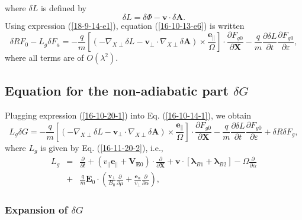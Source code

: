 \documentclass{article}
\newcommand{\tmmathbf}[1]{\ensuremath{\boldsymbol{#1}}}
\begin{document}
where $\delta L$ is defined by
\begin{equation}
  \label{19-1-2-p1} \delta L = \delta \Phi -\mathbf{v} \cdot \delta
  \mathbf{A}.
\end{equation}
Using expression (\ref{18-9-14-e1}), equation (\ref{16-10-13-e6}) is written
\begin{equation}
  \label{16-10-20-1} \delta R F_0 - L_g \delta F_a = - \frac{q}{m} \left[ (-
  \nabla_{X \perp} \delta L -\mathbf{v}_{\perp} \cdot \nabla_{X \perp} \delta
  \mathbf{A}) \times \frac{\tmmathbf{e}_{\parallel}}{\Omega} \right] \cdot
  \frac{\partial F_{g 0}}{\partial \mathbf{X}} - \frac{q}{m}  \frac{\partial
  \delta L}{\partial t}  \frac{\partial F_{g 0}}{\partial \varepsilon},
\end{equation}
where all terms are of $O (\lambda^2)$.

\subsection{Equation for the non-adiabatic part $\delta G$}

Plugging expression (\ref{16-10-20-1}) into Eq. (\ref{16-10-14-1}), we obtain
\begin{equation}
  \label{16-10-14-3} L_g \delta G = - \frac{q}{m} \left[ (- \nabla_{X \perp}
  \delta L -\mathbf{v}_{\perp} \cdot \nabla_{X \perp} \delta \mathbf{A})
  \times \frac{\tmmathbf{e}_{\parallel}}{\Omega} \right] \cdot \frac{\partial
  F_{g 0}}{\partial \mathbf{X}} - \frac{q}{m}  \frac{\partial \delta
  L}{\partial t}  \frac{\partial F_{g 0}}{\partial \varepsilon} + \delta R
  \delta F_g,
\end{equation}
where $L_g$ is given by Eq. (\ref{16-11-20-2}), i.e.,
\begin{eqnarray}
  L_g & = & \frac{\partial}{\partial t} + (v_{\parallel}
  \mathbf{e}_{\parallel} +\mathbf{V}_{\mathbf{E}0}) \cdot
  \frac{\partial}{\partial \mathbf{X}} +\mathbf{v} \cdot
  [\tmmathbf{\lambda}_{B 1} +\tmmathbf{\lambda}_{B 2}] - \Omega
  \frac{\partial}{\partial \alpha} \nonumber\\
  & + & \frac{q}{m} \mathbf{E}_0 \cdot \left( \frac{\mathbf{v}_{\perp}}{B_0} 
  \frac{\partial}{\partial \mu} + \frac{\tmmathbf{e}_{\alpha}}{v_{\perp}} 
  \frac{\partial}{\partial \alpha} \right), 
\end{eqnarray}
\subsubsection{Expansion of $\delta G$}\label{17-5-5-p1}
\end{document}
